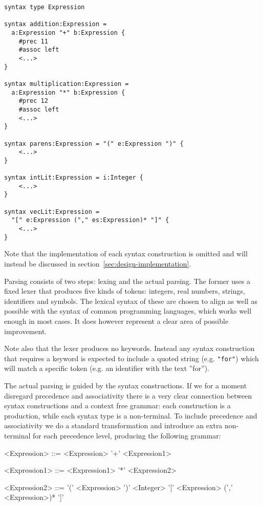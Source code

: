 \documentclass{kththesis}
\begin{document}
\begin{verbatim}
syntax type Expression

syntax addition:Expression =
  a:Expression "+" b:Expression {
    #prec 11
    #assoc left
    <...>
}

syntax multiplication:Expression =
  a:Expression "*" b:Expression {
    #prec 12
    #assoc left
    <...>
}

syntax parens:Expression = "(" e:Expression ")" {
    <...>
}

syntax intLit:Expression = i:Integer {
    <...>
}

syntax vecLit:Expression =
  "[" e:Expression ("," es:Expression)* "]" {
    <...>
}
\end{verbatim}

Note that the implementation of each syntax construction is omitted and will instead be discussed in section~\ref{sec:design-implementation}.

Parsing consists of two steps: lexing and the actual parsing. The former uses a fixed lexer that produces five kinds of tokens: integers, real numbers, strings, identifiers and symbols. The lexical syntax of these are chosen to align as well as possible with the syntax of common programming languages, which works well enough in most cases. It does however represent a clear area of possible improvement.

Note also that the lexer produces no keywords. Instead any syntax construction that requires a keyword is expected to include a quoted string (e.g. \texttt{"for"}) which will match a specific token (e.g. an identifier with the text ''for'').

The actual parsing is guided by the syntax constructions. If we for a moment disregard precedence and associativity there is a very clear connection between syntax constructions and a context free grammar: each construction is a production, while each syntax type is a non-terminal. To include precedence and associativity we do a standard transformation and introduce an extra non-terminal for each precedence level, producing the following grammar:

\setlength{\grammarindent}{8em}
\begin{grammar}
<Expression> ::= <Expression> '+' <Expression1>

<Expression1> ::= <Expression1> '*' <Expression2>

<Expression2> ::= '(' <Expression> ')'
  \alt <Integer>
  \alt '[' <Expression> (',' <Expression>)* ']'
\end{grammar}
\end{document}

